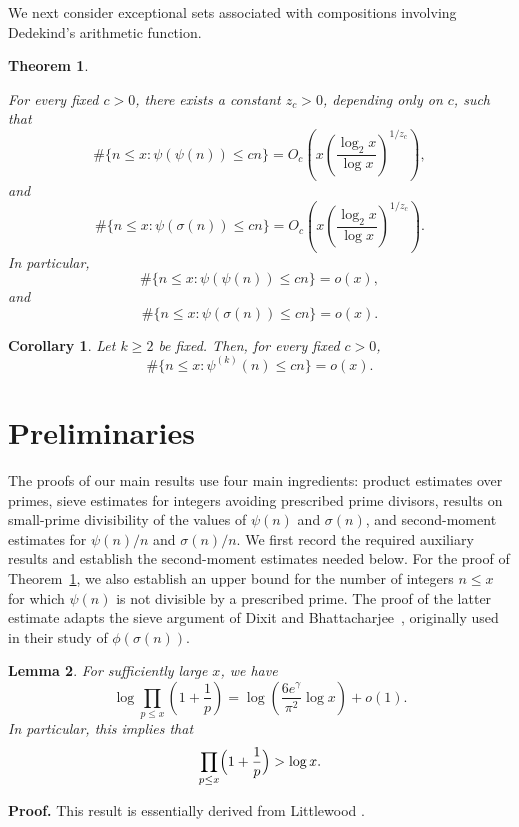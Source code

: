 \documentclass{article}
\newtheorem{theorem}{Theorem}[section]
\newtheorem{corollary}{Corollary}[section]
\newtheorem{lemma}[theorem]{Lemma}
\theoremstyle{remark}
\begin{document}
We next consider exceptional sets associated with compositions
involving Dedekind's arithmetic function.

\begin{theorem}\label{thm-4}

  For every fixed \(c>0\), there exists a constant \(z_c>0\), depending only
on \(c\), such that
\[
\#\bigl\{n\le x:\psi(\psi(n))\le cn\bigr\}
=
O_c\left(
x\left(\frac{\log_2 x}{\log x}\right)^{1/z_c}
\right),
\]
and
\[
\#\bigl\{n\le x:\psi(\sigma(n))\le cn\bigr\}
=
O_c\left(
x\left(\frac{\log_2 x}{\log x}\right)^{1/z_c}
\right).
\]
In particular,
\[
\#\bigl\{n\le x:\psi(\psi(n))\le cn\bigr\}=o(x),
\]
and
\[
\#\bigl\{n\le x:\psi(\sigma(n))\le cn\bigr\}=o(x).
\]
\end{theorem}

\begin{corollary}\label{cor:iterations}
Let $k\geq2$ be fixed. Then, for every fixed $c>0$,
\[
\#\{n\le x:\psi^{(k)}(n)\le cn\}=o(x).
\]
\end{corollary}

\bigskip

\section{\bf Preliminaries}
\bigskip
The proofs of our main results use four main ingredients: product estimates
over primes, sieve estimates for integers avoiding prescribed prime
divisors, results on small-prime divisibility of the values of
\(\psi(n)\) and \(\sigma(n)\), and second-moment estimates for
\(\psi(n)/n\) and \(\sigma(n)/n\). We first record the required auxiliary
results and establish the second-moment estimates needed below. For the
proof of Theorem~\ref{thm-4}, we also establish an upper bound for the
number of integers \(n\le x\) for which \(\psi(n)\) is not divisible by
a prescribed prime. The proof of the latter estimate adapts the sieve
argument of Dixit and Bhattacharjee~\cite{Bhattacharjee}, originally used
in their study of \(\phi(\sigma(n))\).



\begin{lemma}\label{sieve1-lemma}
For sufficiently large \(x\), we have
\[ \log\prod_{p\le x}\left ( 1+\frac{1}{p} \right )  = \log\left ( \frac{6e^{\gamma } }{\pi^{2}}\log x  \right )+o\left ( 1 \right ).\]
In particular, this implies that
\[
\prod_{p\le x}\Bigl(1+\frac1p\Bigr) > \log x.
\]
\end{lemma}

\textbf{Proof.} This result is essentially derived from Littlewood \cite[Lemma 1]{Littlewood}.
\end{document}
